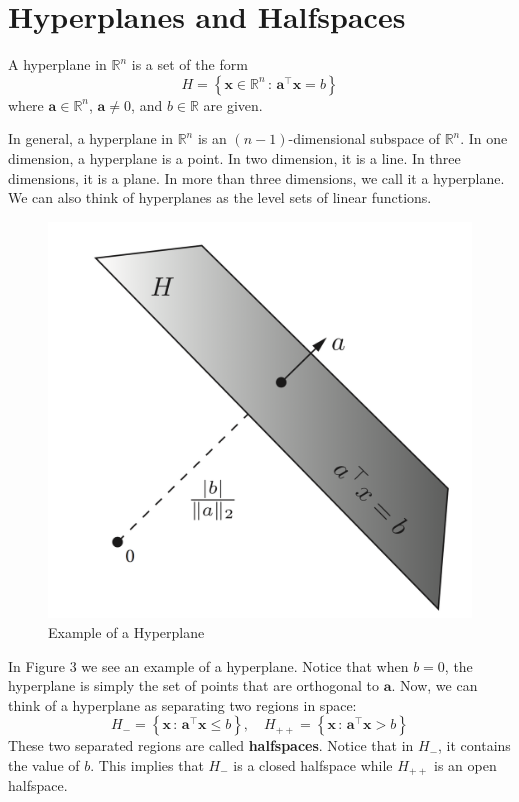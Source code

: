\documentclass[12pt]{article}
\begin{document}
\section{Hyperplanes and Halfspaces}
\begin{definition}
A hyperplane in $\mathbb{R}^n$ is a set of the form $$H = \left\{\mathbf{x}\in\mathbb{R}^n\,:\, \mathbf{a}^\top\mathbf{x} = b\right\}$$ where $\mathbf{a}\in \mathbb{R}^n$, $\mathbf{a}\neq 0$, and $b\in\mathbb{R}$ are given. 
\end{definition}
\noindent In general, a hyperplane in $\mathbb{R}^n$ is an $(n-1)$-dimensional subspace of $\mathbb{R}^n$. In one dimension, a hyperplane is a point. In two dimension, it is a line. In three dimensions, it is a plane. In more than three dimensions, we call it a hyperplane. We can also think of hyperplanes as the level sets of linear functions. 
\pagebreak
  \begin{figure}[h!]\begin{center}\includegraphics[scale=0.2]{figures/hyperplane}\caption{Example of a Hyperplane}\end{center}\end{figure}

\noindent In Figure 3 we see an example of a hyperplane.
\noindent Notice that when $b=0$, the hyperplane is simply the set of points that are orthogonal to $\mathbf{a}$. Now, we can think of a hyperplane as separating two regions in space: $$H_{-} = \left\{\mathbf{x}\,:\, \mathbf{a}^\top\mathbf{x}\leqslant b\right\},\quad H_{++} = \left\{\mathbf{x}\,:\, \mathbf{a}^\top\mathbf{x}> b\right\}$$ These two separated regions are called \textbf{halfspaces}. Notice that in $H_{-}$, it contains the value of $b$. This implies that $H_{-}$ is a closed halfspace while $H_{++}$ is an open halfspace.
\end{document}
